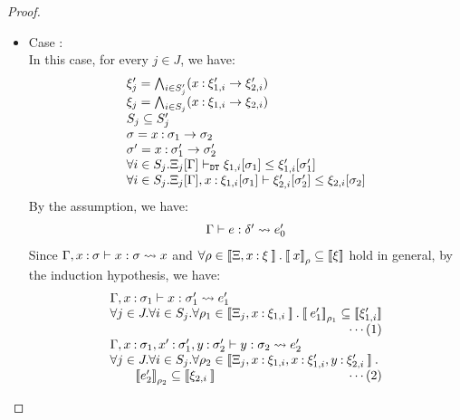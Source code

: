 \begin{proof}
\begin{itemize}
\item Case :\\
In this case, for every \(j\in J\), we have:
\[
\begin{array}{l}
\xi_j' = \bigwedge_{i\in S_j'} (x\mathbin{:}\xi'_{1,i}\rightarrow \xi'_{2,i})\\
\xi_j = \bigwedge_{i\in S_j} (x\mathbin{:}\xi_{1,i}\rightarrow \xi_{2,i})\\
S_j\subseteq S_j'\\
\sigma = x\mathbin{:}\sigma_1 \rightarrow \sigma_2\\
\sigma' = x\mathbin{:}\sigma_1'\rightarrow \sigma_2'\\
\forall i\in S_j.
\Xi_j[\Gamma] \vdash_{\texttt{DT}} \xi_{1,i}[\sigma_1] \leq \xi'_{1,i}[\sigma'_1]\\
\forall i\in S_j.
\Xi_j[\Gamma],x\mathbin{:}\xi_{1,i}[\sigma_1] \vdash \xi'_{2,i}[\sigma'_2]\leq \xi_{2,i}[\sigma_2]
\end{array}
\]
By the assumption, we have:
\[
\begin{array}{l}
\Gamma \vdash e : \delta' \leadsto e_0'\\
\end{array}
\]
Since \(\Gamma, x\mathbin{:}\sigma \vdash x : \sigma \leadsto x\) and \(\forall \rho\in\mathbin{[\![}\Xi,x\mathbin{:}\xi\mathbin{]\!]}.\mathbin{[\![}x\mathbin{]\!]}_{\rho}\subseteq \mathbin{[\![}\xi\mathbin{]\!]}\)
hold in general, by the induction hypothesis, we have:
\[
\begin{array}{l}
\T{\Gamma,x\COL\sigma_1}{x}{\sigma_1'}{e_1'}\\
\forall j\in J.\forall i\in S_j.\forall \env_1\in\sem{\Xi_j,x\COL\xi_{1,i}}.
   \esem{e_1'}{\env_1}\subseteq \sem{\xi'_{1,i}} \\
\hfill \cdots \mbox{(1)}\\
\T{\Gamma,x\COL\sigma_1,x'\COL\sigma_1',y\COL\sigma_2'}{y}{\sigma_2}{e_2'}\\
\forall j\in J.\forall i\in S_j.\forall \env_2\in\sem{\Xi_j,x\COL\xi_{1,i},x\COL\xi'_{1,i},y\COL\xi_{2,i}'}.\\
\qquad   \esem{e_2'}{\env_2}\subseteq \sem{\xi_{2,i}}
\hfill \cdots \mbox{(2)}\\
\end{array}
\]


\end{itemize}
\end{proof}
